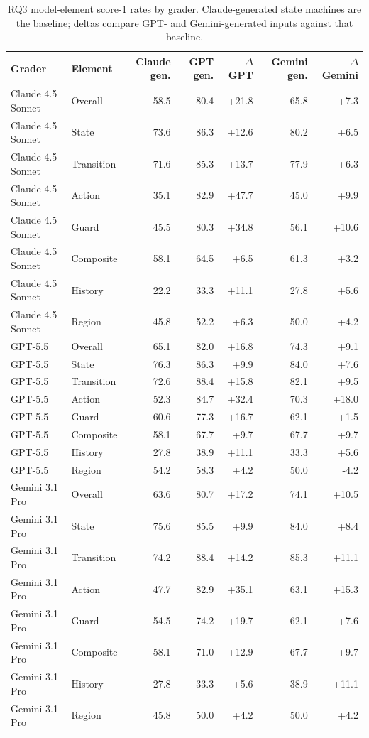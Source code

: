 \begin{table}[t]
\centering
\small
\caption{RQ3 model-element score-1 rates by grader. Claude-generated state machines are the baseline; deltas compare GPT- and Gemini-generated inputs against that baseline.}
\label{tab:rq3-element-score1-rates}
\begin{tabular}{llrrrrr}
\toprule
Grader & Element & Claude gen. & GPT gen. & $\Delta$ GPT & Gemini gen. & $\Delta$ Gemini \\
\midrule
Claude 4.5 Sonnet & Overall & 58.5 & 80.4 & +21.8 & 65.8 & +7.3 \\
Claude 4.5 Sonnet & State & 73.6 & 86.3 & +12.6 & 80.2 & +6.5 \\
Claude 4.5 Sonnet & Transition & 71.6 & 85.3 & +13.7 & 77.9 & +6.3 \\
Claude 4.5 Sonnet & Action & 35.1 & 82.9 & +47.7 & 45.0 & +9.9 \\
Claude 4.5 Sonnet & Guard & 45.5 & 80.3 & +34.8 & 56.1 & +10.6 \\
Claude 4.5 Sonnet & Composite & 58.1 & 64.5 & +6.5 & 61.3 & +3.2 \\
Claude 4.5 Sonnet & History & 22.2 & 33.3 & +11.1 & 27.8 & +5.6 \\
Claude 4.5 Sonnet & Region & 45.8 & 52.2 & +6.3 & 50.0 & +4.2 \\
GPT-5.5 & Overall & 65.1 & 82.0 & +16.8 & 74.3 & +9.1 \\
GPT-5.5 & State & 76.3 & 86.3 & +9.9 & 84.0 & +7.6 \\
GPT-5.5 & Transition & 72.6 & 88.4 & +15.8 & 82.1 & +9.5 \\
GPT-5.5 & Action & 52.3 & 84.7 & +32.4 & 70.3 & +18.0 \\
GPT-5.5 & Guard & 60.6 & 77.3 & +16.7 & 62.1 & +1.5 \\
GPT-5.5 & Composite & 58.1 & 67.7 & +9.7 & 67.7 & +9.7 \\
GPT-5.5 & History & 27.8 & 38.9 & +11.1 & 33.3 & +5.6 \\
GPT-5.5 & Region & 54.2 & 58.3 & +4.2 & 50.0 & -4.2 \\
Gemini 3.1 Pro & Overall & 63.6 & 80.7 & +17.2 & 74.1 & +10.5 \\
Gemini 3.1 Pro & State & 75.6 & 85.5 & +9.9 & 84.0 & +8.4 \\
Gemini 3.1 Pro & Transition & 74.2 & 88.4 & +14.2 & 85.3 & +11.1 \\
Gemini 3.1 Pro & Action & 47.7 & 82.9 & +35.1 & 63.1 & +15.3 \\
Gemini 3.1 Pro & Guard & 54.5 & 74.2 & +19.7 & 62.1 & +7.6 \\
Gemini 3.1 Pro & Composite & 58.1 & 71.0 & +12.9 & 67.7 & +9.7 \\
Gemini 3.1 Pro & History & 27.8 & 33.3 & +5.6 & 38.9 & +11.1 \\
Gemini 3.1 Pro & Region & 45.8 & 50.0 & +4.2 & 50.0 & +4.2 \\
\bottomrule
\end{tabular}
\end{table}
